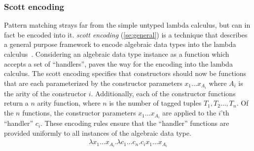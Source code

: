 \documentclass[11pt,oneside,a4paper]{report}
\begin{document}
\subsubsection{Scott encoding}
Pattern matching strays far from the simple untyped lambda calculus, but can in fact be encoded into it.
\textit{scott encoding} (\autoref{se:general}) is a technique that describes a general purpose framework to encode algebraic data types into the lambda calculus~\cite{scott1962system}.
Considering an algebraic data type instance as a function which accepts a set of ``handlers'', paves the way for the encoding into the lambda calculus.
The scott encoding specifies that constructors should now be functions that are each parameterized by the constructor parameters $x_1 \dots x_{A_i}$ where $A_i$ is the arity of the constructor $i$.
Additionally, each of the constructor functions return a $n$ arity function, where $n$ is the number of tagged tuples $T_1, T_2 \dots , T_n$.
Of the $n$ functions, the constructor parameters $x_1 \dots x_{A_i}$ are applied to the $i$'th ``handler'' $c_i$.
These encoding rules ensure that the ``handler'' functions are provided uniformly to all instances of the algebraic data type.
\begin{align}
    \lambda x_1 \dots x_{A_i}. \lambda c_1 \dots c_n. c_i x_1 \dots x_{A_i}
\label{se:general}
\end{align}
\end{document}
